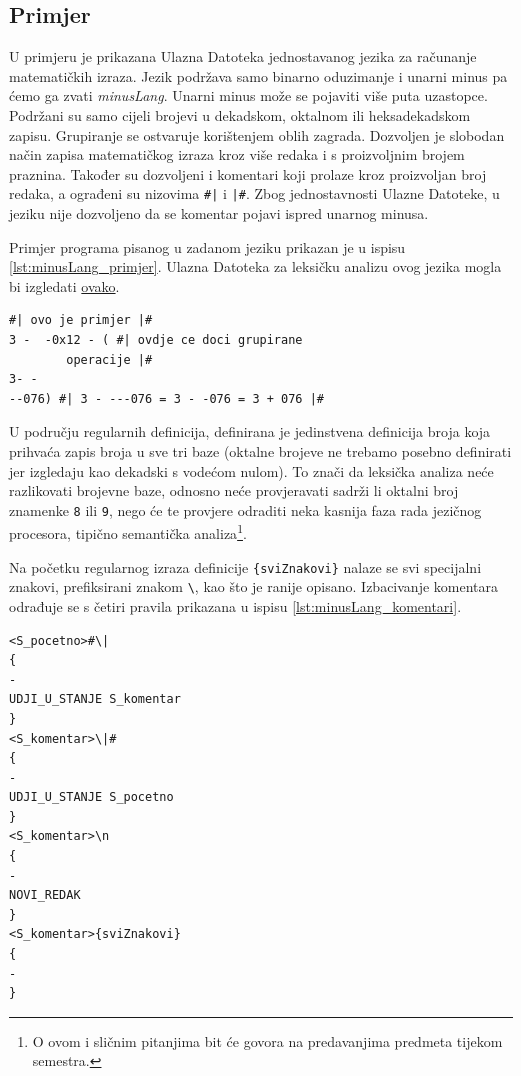 \documentclass[times, 12pt, utf8]{book}
\begin{document}
\subsection{Primjer}\label{sec:generator_primjer}
U primjeru je prikazana Ulazna Datoteka jednostavanog jezika za računanje matematičkih izraza.
Jezik podržava samo binarno oduzimanje i unarni minus pa ćemo ga zvati \emph{minusLang}.
Unarni minus može se pojaviti više puta uzastopce.
Podržani su samo cijeli brojevi u dekadskom, oktalnom ili heksadekadskom zapisu.
Grupiranje se ostvaruje korištenjem oblih zagrada.
Dozvoljen je slobodan način zapisa matematičkog izraza kroz više redaka i s proizvoljnim brojem praznina.
Također su dozvoljeni i komentari koji prolaze kroz proizvoljan broj redaka, a ograđeni su nizovima \verb=#|= i \verb=|#=.
Zbog jednostavnosti Ulazne Datoteke, u jeziku nije dozvoljeno da se komentar pojavi ispred unarnog minusa.

Primjer programa pisanog u zadanom jeziku prikazan je u ispisu \ref{lst:minusLang_primjer}.
Ulazna Datoteka za leksičku analizu ovog jezika mogla bi izgledati \href{https://github.com/fer-ppj/ppj-labosi/raw/master/res/lab1/minusLang.lan}{ovako}.

\begin{lstlisting}[caption={Primjer programa pisanog u jeziku \emph{minusLang}.},label=lst:minusLang_primjer]
#| ovo je primjer |#
3 -  -0x12 - ( #| ovdje ce doci grupirane
		operacije |#
3- -
--076) #| 3 - ---076 = 3 - -076 = 3 + 076 |#

\end{lstlisting}

U području regularnih definicija, definirana je jedinstvena definicija broja koja prihvaća zapis broja u sve tri baze (oktalne brojeve ne trebamo posebno definirati jer izgledaju kao dekadski s vodećom nulom).
To znači da leksička analiza neće razlikovati brojevne baze, odnosno neće provjeravati sadrži li oktalni broj znamenke \verb|8| ili \verb|9|, nego će te provjere odraditi neka kasnija faza rada jezičnog procesora, tipično semantička analiza\footnote{O ovom i sličnim pitanjima bit će govora na predavanjima predmeta tijekom semestra.}.

Na početku regularnog izraza definicije \verb|{sviZnakovi}| nalaze se svi specijalni znakovi, prefiksirani znakom \verb|\|, kao što je ranije opisano.
Izbacivanje komentara odrađuje se s četiri pravila prikazana u ispisu \ref{lst:minusLang_komentari}.

\begin{lstlisting}[caption={Pravila za izbacivanje komentara iz ulaznog programa.},label=lst:minusLang_komentari]
<S_pocetno>#\|
{
-
UDJI_U_STANJE S_komentar
}
<S_komentar>\|#
{
-
UDJI_U_STANJE S_pocetno
}
<S_komentar>\n
{
-
NOVI_REDAK
}
<S_komentar>{sviZnakovi}
{
-
}
\end{lstlisting}
\end{document}
